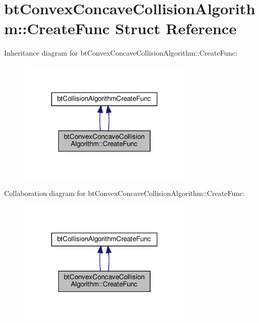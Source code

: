 \hypertarget{structbtConvexConcaveCollisionAlgorithm_1_1CreateFunc}{}\section{bt\+Convex\+Concave\+Collision\+Algorithm\+:\+:Create\+Func Struct Reference}
\label{structbtConvexConcaveCollisionAlgorithm_1_1CreateFunc}


Inheritance diagram for bt\+Convex\+Concave\+Collision\+Algorithm\+:\+:Create\+Func\+:
\nopagebreak
\begin{figure}[H]
\begin{center}
\leavevmode
\includegraphics[width=235pt]{structbtConvexConcaveCollisionAlgorithm_1_1CreateFunc__inherit__graph}
\end{center}
\end{figure}


Collaboration diagram for bt\+Convex\+Concave\+Collision\+Algorithm\+:\+:Create\+Func\+:
\nopagebreak
\begin{figure}[H]
\begin{center}
\leavevmode
\includegraphics[width=235pt]{structbtConvexConcaveCollisionAlgorithm_1_1CreateFunc__coll__graph}
\end{center}
\end{figure}
